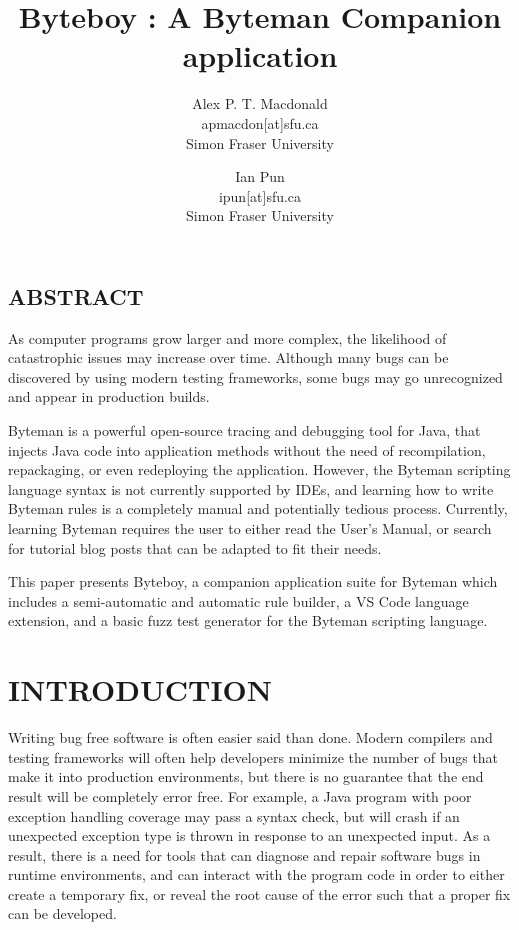 \documentclass[letterpaper,twocolumn,10pt]{article}
\begin{document}
\date{}

\title{\Large \bf Byteboy : A Byteman Companion application}

\author{
{\rm Alex P. T. Macdonald}\\
apmacdon[at]sfu.ca\\
Simon Fraser University
\and
{\rm Ian Pun}\\
ipun[at]sfu.ca\\
Simon Fraser University
} %

\maketitle

\subsection*{ABSTRACT}
As computer programs grow larger and more complex, the likelihood of catastrophic issues may increase over time. Although many bugs can be discovered by using modern testing frameworks, some bugs may go unrecognized and appear in production builds. 

Byteman is a powerful open-source tracing and debugging tool for Java, that injects Java code into application methods without the need of recompilation, repackaging, or even redeploying the application. However, the Byteman scripting language syntax is not currently supported by IDEs, and learning how to write Byteman rules is a completely manual and potentially tedious process. Currently, learning Byteman requires the user to either read the User's Manual, or search for tutorial blog posts that can be adapted to fit their needs. 

This paper presents Byteboy, a companion application suite for Byteman which includes a semi-automatic and automatic rule builder, a VS Code language extension, and a basic fuzz test generator for the Byteman scripting language.  

\section{INTRODUCTION}

Writing bug free software is often easier said than done. Modern compilers and testing frameworks will often help developers minimize the number of bugs that make it into production environments, but there is no guarantee that the end result will be completely error free. For example, a Java program with poor exception handling coverage may pass a syntax check, but will crash if an unexpected exception type is thrown in response to an unexpected input. As a result, there is a need for tools that can diagnose and repair software bugs in runtime environments, and can interact with the program code in order to either create a temporary fix, or reveal the root cause of the error such that a proper fix can be developed.
\end{document}
